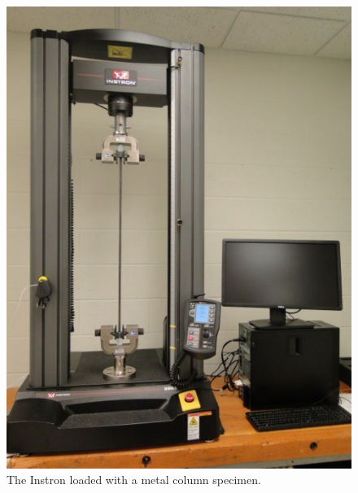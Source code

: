 \documentclass[12 pt]{article}
\begin{document}
\begin{figure}[htbp]
    \centering
    \begin{minipage}{0.45\textwidth}
        \centering
		\includegraphics[width=1.0\textwidth]{images/instron_1}
		\caption{The Instron loaded with a metal column specimen.}
		\label{fig:instron_1}
    \end{minipage}\hfill
    \begin{minipage}{0.45\textwidth}
        \centering

\end{minipage}
\end{figure}
\end{document}
